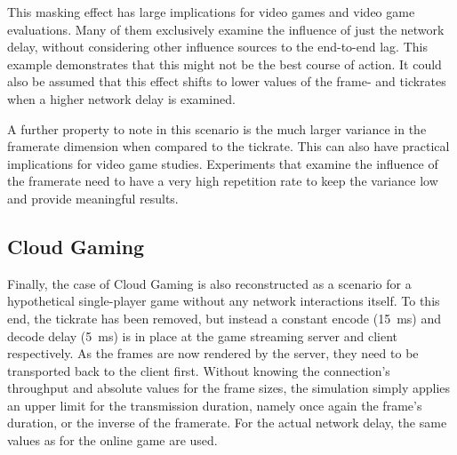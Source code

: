This masking effect has large implications for video games and video game evaluations. Many of them exclusively examine the influence of just the network delay, without considering other influence sources to the end-to-end lag. This example demonstrates that this might not be the best course of action. It could also be assumed that this effect shifts to lower values of the frame- and tickrates when a higher network delay is examined.

A further property to note in this scenario is the much larger variance in the framerate dimension when compared to the tickrate. This can also have practical implications for video game studies. Experiments that examine the influence of the framerate need to have a very high repetition rate to keep the variance low and provide meaningful results.


\subsection{Cloud Gaming}

Finally, the case of Cloud Gaming is also reconstructed as a scenario for a hypothetical single-player game without any network interactions itself. To this end, the tickrate has been removed, but instead a constant encode (\SI{15}{\milli\second}) and decode delay (\SI{5}{\milli\second}) is in place at the game streaming server and client respectively. As the frames are now rendered by the server, they need to be transported back to the client first. 
Without knowing the connection's throughput and absolute values for the frame sizes, the simulation simply applies an upper limit for the transmission duration, namely once again the frame's duration, or the inverse of the framerate. For the actual network delay, the same values as for the online game are used.

